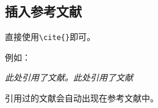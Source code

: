 \documentclass[12pt,hyperref,a4paper,UTF8,fontset=fandol]{ctexart}
\begin{document}
\subsection{插入参考文献}
直接使用\verb|\cite{}|即可\cite{DBLP:conf/nips/VaswaniSPUJGKP17}。

例如：


   \textit{ 此处引用了文献\cite{0Isaac}。此处引用了文献\cite{2016The}}


引用过的文献会自动出现在参考文献中。



\end{document}
